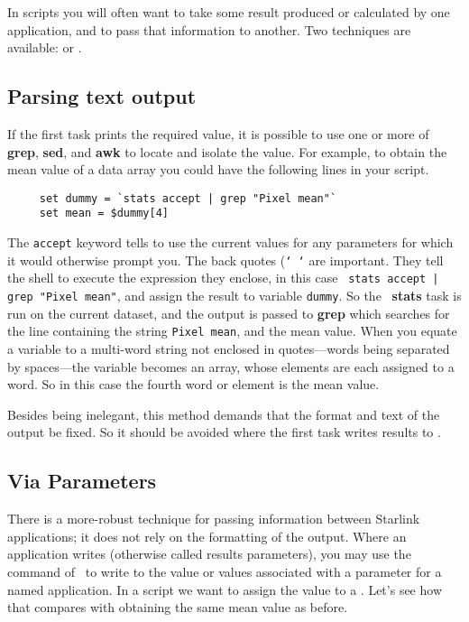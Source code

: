 In scripts you will often want to take some result produced or
calculated by one application, and to pass that information to another.
Two techniques are available:  or
.

\subsection{Parsing text output
\label{sc4_se_info_parse}}

If the first task prints the required value, it is possible to use one
or more of {\bf grep}, {\bf sed}, and {\bf awk} to locate and isolate
the value.  For example, to obtain the mean value of a data array you
could have the following lines in your script.

\small
\begin{verbatim}
     set dummy = `stats accept | grep "Pixel mean"`
     set mean = $dummy[4]
\end{verbatim}
\normalsize

The {\tt accept} keyword tells  to use
the current values for any parameters for which it would otherwise
prompt you.  The back quotes ({\tt `~`} are important.  They tell the
shell to execute the expression they enclose, in this case \mbox{{\tt
stats accept | grep "Pixel mean"}}, and assign the result to variable
{\tt dummy}. So the \KAPPAref\normalsize\ {\bf stats} task is run on
the current dataset, and the output is passed to {\bf grep} which
searches for the line containing the string {\tt Pixel mean}, and the
mean value.  When you equate a variable to a multi-word string not
enclosed in quotes---words being separated by spaces---the variable
becomes an array, whose elements are each assigned to a word.  So in
this case the fourth word or element is the mean value.

Besides being inelegant, this method demands that the format and
text of the output be fixed.  So it should be avoided where the
first task writes results to .

\subsection{Via Parameters
\label{sc4_se_info_parameter}}

There is a more-robust technique for passing information between
Starlink applications; it does not rely on the formatting of the
output. Where an application writes  (otherwise called results parameters), you
may use the  command of \KAPPAref\
to write to  the value
or values associated with a parameter for a named application. In a
script we want to assign the value to a .  Let's see how that compares with
obtaining the same mean value as before.

